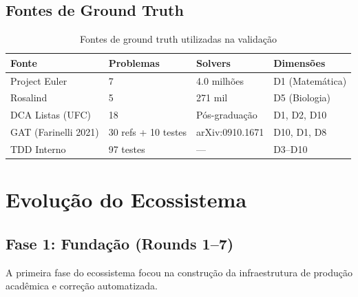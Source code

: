 \documentclass[12pt,a4paper,oneside]{article}
\begin{document}
\subsection{Fontes de Ground Truth}

\begin{table}[H]
\centering
\caption{Fontes de ground truth utilizadas na validação}
\label{tab:groundtruth}
\begin{tabular}{p{}p{}p{}p{}}
\toprule
\textbf{Fonte} & \textbf{Problemas} & \textbf{Solvers} & \textbf{Dimensões} \\
\midrule
Project Euler & 7 & 4.0 milhões & D1 (Matemática) \\
Rosalind & 5 & 271 mil & D5 (Biologia) \\
DCA Listas (UFC) & 18 & Pós-graduação & D1, D2, D10 \\
GAT (Farinelli 2021) & 30 refs + 10 testes & arXiv:0910.1671 & D10, D1, D8 \\
TDD Interno & 97 testes & — & D3--D10 \\
\bottomrule
\end{tabular}
\end{table}

\section{Evolução do Ecossistema}

\subsection{Fase 1: Fundação (Rounds 1--7)}

A primeira fase do ecossistema focou na construção da infraestrutura
de produção acadêmica e correção automatizada.
\end{document}
